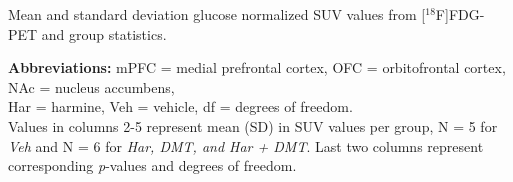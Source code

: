 \documentclass[tikz,crop,convert={density=400,outext=.png}]{standalone}
\begin{document}
\begin{table}
\begin{threeparttable}
\robustify\bfseries
\caption{Mean and standard deviation glucose normalized SUV values from [$^{18}$F]FDG-PET and group statistics.}

    \begin{tablenotes}
      \item\footnotesize{\textbf{Abbreviations:} mPFC = medial prefrontal cortex, OFC = orbitofrontal cortex, NAc = nucleus accumbens,  \\ Har = harmine, Veh =  vehicle, df = degrees of freedom.  \\
Values in columns 2-5 represent mean (SD) in SUV values per group, N = 5 for \textit{Veh} and N = 6 for \textit{Har, DMT, and Har + DMT}.  Last two columns represent corresponding \textit{p}-values and degrees of freedom. }
    \end{tablenotes}
  \end{threeparttable}
\end{table}
\end{document}
